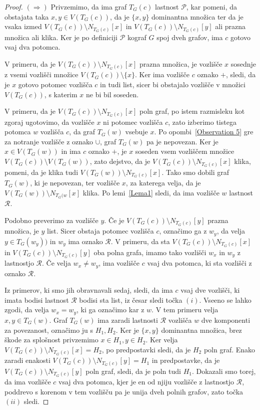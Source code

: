 \documentclass[12pt,a4paper,twoside]{article}
\theoremstyle{definition} %
\theoremstyle{plain} %
\numberwithin{equation}{section}  %
\begin{document}
\begin{proof}
$(\Rightarrow)$ Privzemimo, da ima graf $T_G(c)$ lastnost $\mathcal{P}$, kar pomeni, da obstajata taka $x, y \in V(T_G(c))$, da je $\{x, y\}$ dominantna množica ter da je vsaka izmed $V(T_G(c)) \setminus N_{T_G(c)}[x]$ in $V(T_G(c)) \setminus N_{T_G(c)}[y]$ ali prazna množica ali klika. Ker je po definiciji $\mathcal{P}$ kograf $G$ spoj dveh grafov, ima $c$ gotovo vsaj dva potomca. 

V primeru, da je $V(T_G(c)) \setminus N_{T_G(c)}[x]$ prazna množica, je vozlišče $x$ sosednje z vsemi vozlišči množice $V(T_G(c)) \setminus \{x\}$. Ker ima vozlišče $c$ oznako $+$, sledi, da je $x$ gotovo potomec vozlišča $c$ in tudi list, sicer bi obstajalo vozlišče v množici $V(T_G(c))$, s katerim $x$ ne bi bil soseden.

V primeru, da je $V(T_G(c)) \setminus N_{T_G(c)}[x]$ poln graf, po istem razmisleku kot zgoraj ugotovimo, da vozlišče $x$ ni potomec vozlišča $c$, zato izberimo tistega potomca $w$ vozlišča $c$, da graf $T_G(w)$ vsebuje $x$. Po opombi~\ref{Observation 5} gre za notranje vozlišče z oznako $\cup$, graf $T_G(w)$ pa je nepovezan. Ker je $x \in V(T_G(w))$ in ima $c$ oznako $+$, je $x$ soseden vsem vozliščem množice $V(T_G(c)) \setminus V(T_G(w))$, zato dejstvo, da je $V(T_G(c)) \setminus N_{T_G(c)}[x]$ klika, pomeni, da je klika tudi $V(T_G(w)) \setminus N_{T_G(c)}[x]$. Tako smo dobili graf $T_G(w)$, ki je nepovezan, ter vozlišče $x$, za katerega velja, da je $V(T_G(w)) \setminus N_{T_G(w}[x]$ klika. Po lemi~\ref{Lema1} sledi, da ima vozlišče $w$ lastnost $\mathcal{R}$.

Podobno preverimo za vozlišče $y$. Če je $V(T_G(c)) \setminus N_{T_G(c)}[y]$ prazna množica, je $y$ list. Sicer obstaja potomec vozlišča $c$, označimo ga z $w_y$, da velja $y \in T_G(w_y))$ in $w_y$ ima oznako $\mathcal{R}$. V primeru, da sta  $V(T_G(c)) \setminus N_{T_G(c)}[x]$ in  $V(T_G(c)) \setminus N_{T_G(c)}[y]$ oba polna grafa, imamo tako vozlišči $w_x$ in $w_y$ z lastnostjo $\mathcal{R}$. Če velja $w_x \neq w_y$, ima vozlišče $c$ vsaj dva potomca, ki sta vozlišči z oznako $\mathcal{R}$.

Iz primerov, ki smo jih obravnavali sedaj, sledi, da ima $c$ vsaj dve vozlišči, ki imata bodisi lastnost $\mathcal{R}$ bodisi sta list, iz česar sledi točka $(i)$. Vseeno se lahko zgodi, da velja $w_x=w_y$, ki ga označimo kar z $w$. V tem primeru velja $x, y \in T_G(w)$. Graf $T_G(w)$ ima zaradi lastnosti $\mathcal{R}$ vozlišča $w$ dve komponenti za povezanost, označimo ju s $H_1, H_2$. Ker je $\{x, y\}$ dominantna množica, brez škode za splošnost privzemimo $x \in H_1, y \in H_2$. Ker velja $V(T_G(c)) \setminus N_{T_G(c)}[x] = H_2$, po predpostavki sledi, da je $H_2$ poln graf. Enako zaradi enakosti $V(T_G(c)) \setminus N_{T_G(c)}[y] = H_1$ in predpostavke, da je $V(T_G(c)) \setminus N_{T_G(c)}[y]$ poln graf, sledi, da je poln tudi $H_1$. Dokazali smo torej, da ima vozlišče $c$ vsaj dva potomca, kjer je en od njiju vozlišče z lastnostjo $\mathcal{R}$, poddrevo s korenom v tem vozlišču pa je unija dveh polnih grafov, zato točka $(ii)$ sledi.


\end{proof}
\end{document}
